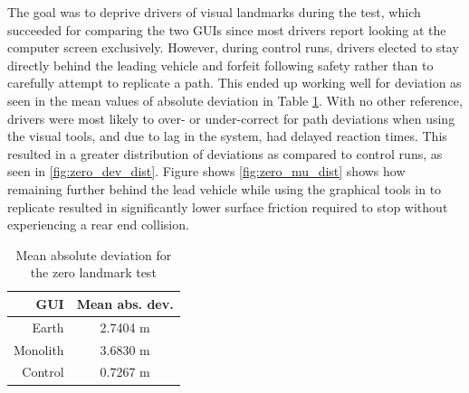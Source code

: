 The goal was to deprive drivers of visual landmarks during the test, which succeeded for comparing the two GUIs since most drivers report looking at the computer screen exclusively. However, during control runs, drivers elected to stay directly behind the leading vehicle and forfeit following safety rather than to carefully attempt to replicate a path. This ended up working well for deviation as seen in the mean values of absolute deviation in Table \ref{tab:zero_dev_mean}.
With no other reference, drivers were most likely to over- or under-correct for path deviations when using the visual tools, and due to lag in the system, had delayed reaction times. This resulted in a greater distribution of deviations as compared to control runs, as seen in \ref{fig:zero_dev_dist}. 
Figure shows \ref{fig:zero_mu_dist} shows how remaining further behind the lead vehicle while using the graphical tools in to replicate resulted in significantly lower surface friction required to stop without experiencing a rear end collision.

\begin{table}[htbp] \centering \caption{Mean absolute deviation for the zero landmark test}
\begin{tabular}{r|c} 
    GUI&    Mean abs. dev. \\ \hline\hline
    Earth&      2.7404 m \\
    Monolith&   3.6830 m \\
    Control&    0.7267 m \\ \hline   
\end{tabular} \label{tab:zero_dev_mean} \end{table}